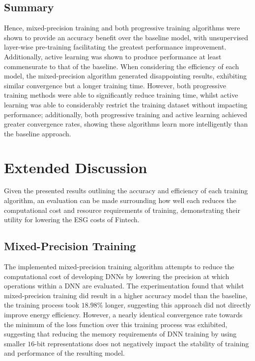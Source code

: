\documentclass[a4paper, 11pt]{report}
\begin{document}
    \subsection{Summary}

    Hence, mixed-precision training and both progressive training algorithms were shown to provide an accuracy benefit over the baseline model, with unsupervised layer-wise pre-training facilitating the greatest performance improvement. Additionally, active learning was shown to produce performance at least commensurate to that of the baseline. When considering the efficiency of each model, the mixed-precision algorithm generated disappointing results, exhibiting similar convergence but a longer training time. However, both progressive training methods were able to significantly reduce training time, whilst active learning was able to considerably restrict the training dataset without impacting performance; additionally, both progressive training and active learning achieved greater convergence rates, showing these algorithms learn more intelligently than the baseline approach.


    \section{Extended Discussion}

    Given the presented results outlining the accuracy and efficiency of each training algorithm, an evaluation can be made surrounding how well each reduces the computational cost and resource requirements of training, demonstrating their utility for lowering the ESG costs of Fintech.


    \subsection{Mixed-Precision Training}

    The implemented mixed-precision training algorithm attempts to reduce the computational cost of developing DNNs by lowering the precision at which operations within a DNN are evaluated. The experimentation found that whilst mixed-precision training did result in a higher accuracy model than the baseline, the training process took $18.98\%$ longer, suggesting this approach did not directly improve energy efficiency. However, a nearly identical convergence rate towards the minimum of the loss function over this training process was exhibited, suggesting that reducing the memory requirements of DNN training by using smaller $16$-bit representations does not negatively impact the stability of training and performance of the resulting model.
\end{document}
